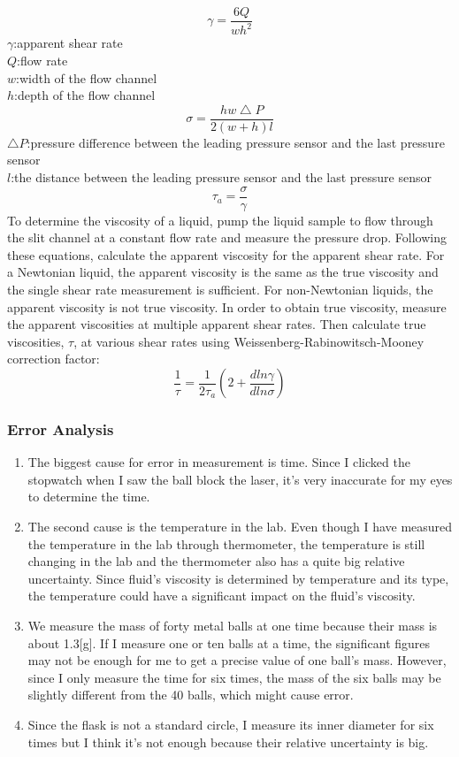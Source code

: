 \documentclass[12pt]{article}
\begin{document}
\begin{enumerate}
$$\gamma=\frac{6Q}{w{h^2}}$$
{\centering \footnotesize  $\gamma$:apparent shear rate\\$Q$:flow rate\\$w$:width of the flow channel\\$h$:depth of the flow channel\\
} 
$$\sigma=\frac{hw\bigtriangleup{P}}{2(w+h)l}$$
{\centering \footnotesize  $\bigtriangleup{P}$:pressure difference between the leading pressure sensor and the last pressure sensor\\$l$:the distance between the leading pressure sensor and the last pressure sensor\\
} 
$$\tau_a=\frac{\sigma}{\gamma}$$
To determine the viscosity of a liquid, pump the liquid sample to flow through the slit channel at a constant flow rate and measure the pressure drop. Following these equations, calculate the apparent viscosity for the apparent shear rate. For a Newtonian liquid, the apparent viscosity is the same as the true viscosity and the single shear rate measurement is sufficient. For non-Newtonian liquids, the apparent viscosity is not true viscosity. In order to obtain true viscosity, measure the apparent viscosities at multiple apparent shear rates. Then calculate true viscosities, $\tau$, at various shear rates using Weissenberg-Rabinowitsch-Mooney correction factor:
$$\frac{1}{\tau}=\frac{1}{2\tau_a}(2+\frac{dln\gamma}{dln\sigma})$$
\end{enumerate}
\subsubsection{Error Analysis}
\begin{enumerate}
\item The biggest cause for error in measurement is time. Since I clicked the stopwatch when I saw the ball block the laser, it's very inaccurate for my eyes to determine the time.
\item The second cause is the temperature in the lab. Even though I have measured the temperature in the lab through thermometer, the temperature is still changing in the lab and the thermometer also has a quite big relative uncertainty. Since fluid's viscosity is determined by temperature and its type, the temperature could have a significant impact on the fluid's viscosity.
\item We measure the mass of forty metal balls at one time because their mass is about 1.3[g]. If I measure one or ten balls at a time, the significant figures may not be enough for me to get a precise value of one ball's mass. However, since I only measure the time for six times, the mass of the six balls may be slightly different from the 40 balls, which might cause error.
\item Since the flask is not a standard circle, I measure its inner diameter for six times but I think it's not enough because their relative uncertainty is big.
\end{enumerate}
\end{document}
